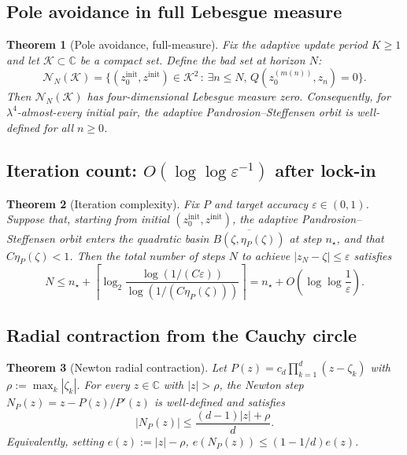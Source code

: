 \documentclass[11pt,a4paper]{article}
\newtheorem{theorem}{Theorem}[section]
\begin{document}
\subsection{Pole avoidance in full Lebesgue measure}

\begin{theorem}[Pole avoidance, full-measure]
Fix the adaptive update period $K \ge 1$ and let $\mathcal{K} \subset \mathbb{C}$ be a compact set. Define the bad set at horizon $N$:
$$ \mathcal{N}_N(\mathcal{K}) = \{(z_0^{\mathrm{init}}, z^{\mathrm{init}}) \in \mathcal{K}^2 \,:\, \exists n \le N, \, Q(z_0^{(m(n))}, z_n) = 0\}. $$
Then $\mathcal{N}_N(\mathcal{K})$ has four-dimensional Lebesgue measure zero. Consequently, for $\lambda^4$-almost-every initial pair, the adaptive Pandrosion--Steffensen orbit is well-defined for all $n \ge 0$.
\end{theorem}

\subsection{Iteration count: $O(\log\log\varepsilon^{-1})$ after lock-in}

\begin{theorem}[Iteration complexity]
Fix $P$ and target accuracy $\varepsilon \in (0, 1)$. Suppose that, starting from initial $(z_0^{\mathrm{init}}, z^{\mathrm{init}})$, the adaptive Pandrosion--Steffensen orbit enters the quadratic basin $\overline{B(\zeta, \eta_P(\zeta))}$ at step $n_\star$, and that $C \eta_P(\zeta) < 1$. Then the total number of steps $N$ to achieve $|z_N - \zeta| \le \varepsilon$ satisfies
\begin{equation}
N \le n_\star + \left\lceil \log_2 \frac{\log(1/(C\varepsilon))}{\log(1/(C \eta_P(\zeta)))} \right\rceil = n_\star + O\!\left( \log\log \frac{1}{\varepsilon} \right).
\end{equation}
\end{theorem}

\subsection{Radial contraction from the Cauchy circle}

\begin{theorem}[Newton radial contraction]\label{thm:radial}
Let $P(z) = c_d \prod_{k=1}^d (z - \zeta_k)$ with $\rho := \max_k |\zeta_k|$. For every $z \in \mathbb{C}$ with $|z| > \rho$, the Newton step $N_P(z) = z - P(z)/P'(z)$ is well-defined and satisfies
\begin{equation}
|N_P(z)| \le \frac{(d - 1)|z| + \rho}{d}.
\end{equation}
Equivalently, setting $e(z) := |z| - \rho$, $e(N_P(z)) \le (1 - 1/d) e(z)$.
\end{theorem}
\end{document}
